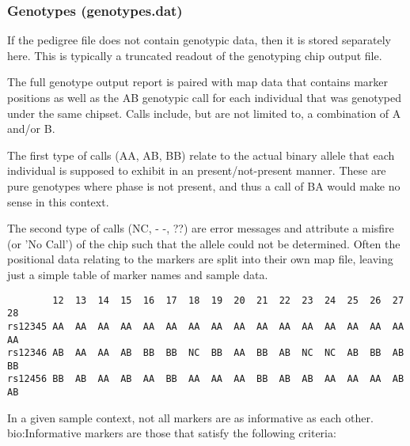 \subsubsection{Genotypes (genotypes.dat)}

If the pedigree file does not contain genotypic data, then it is stored separately here. This is typically a truncated readout of the genotyping chip output file. 

The full genotype output report is paired with map data that contains marker positions as well as the AB genotypic call for each individual that was genotyped under the same chipset. Calls include, but are not limited to, a combination of A and/or B.

The first type of calls (AA, AB, BB) relate to the actual binary allele that each individual is supposed to exhibit in an present/not-present manner. These are pure genotypes where phase is not present, and thus a call of BA would make no sense in this context.

The second type of calls (NC, - -, ??) are error messages and attribute a misfire (or 'No Call') of the chip such that the allele could not be determined.
Often the positional data relating to the markers are split into their own map file, leaving just a simple table of marker names and sample data.

\begingroup
\vspace{10pt}
\begin{lstlisting}
		12	13	14	15	16	17	18	19	20	21	22	23	24	25	26	27	28
rs12345	AA	AA	AA	AA	AA	AA	AA	AA	AA	AA	AA	AA	AA	AA	AA	AA	AA
rs12346	AB	AA	AA	AB	BB	BB	NC	BB	AA	BB	AB	NC	NC	AB	BB	AB	BB
rs12456	BB	AB	AA	AB	AA	BB	AA	AA	AA	BB	AB	AB	AA	AA	AA	AB	AB
\end{lstlisting}
\vspace{-10pt}
\endgroup

In a given sample context, not all markers are as informative as each other.  \gls{bio:Informative marker}s are those that satisfy the following criteria:\label{informativemarkers}

